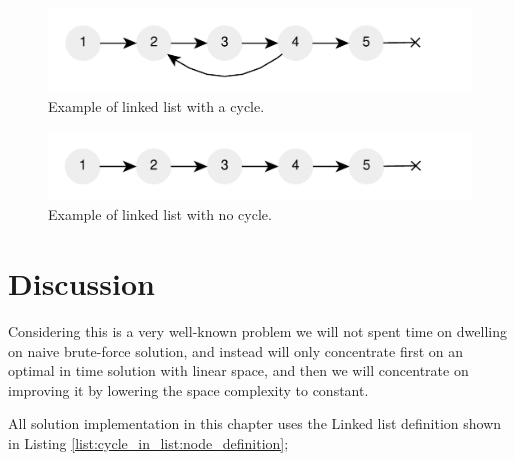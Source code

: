 \begin{figure}
	\centering
	\includegraphics[scale=1.0]{sources/cycle_in_list/images/list_cycle}
	\caption{Example of linked list with a cycle.}
	\label{fig:cycle_in_list:example1}
\end{figure}
\begin{figure}
	\label{fig:cycle_in_list:example2}
	\centering
	\includegraphics[scale=1.0]{sources/cycle_in_list/images/list_no_cycle}
	\caption{Example of linked list with no cycle.}
\end{figure}

%
%

\section{Discussion}
\label{cycle_in_list:sec:discussion}
Considering this is a very well-known problem we will not spent time on dwelling on naive
brute-force solution, and instead will only concentrate first on an optimal in time solution with
linear space, and then we will concentrate on improving it by lowering the space complexity to
constant. 

All solution implementation in this chapter uses the  Linked list definition shown in Listing \ref{list:cycle_in_list:node_definition};


	


